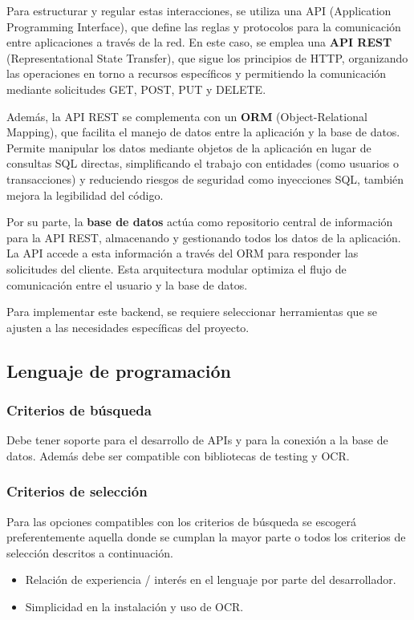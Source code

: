 Para estructurar y regular estas interacciones, se utiliza una API (Application Programming Interface), que define las reglas y protocolos para la comunicación entre aplicaciones a través de la red. En este caso, se emplea una \textbf{API REST} (Representational State Transfer), que sigue los principios de HTTP, organizando las operaciones en torno a recursos específicos y permitiendo la comunicación mediante solicitudes GET, POST, PUT y DELETE. 

Además, la API REST se complementa con un \textbf{ORM} (Object-Relational Mapping), que facilita el manejo de datos entre la aplicación y la base de datos. Permite manipular los datos mediante objetos de la aplicación en lugar de consultas SQL directas, simplificando el trabajo con entidades (como usuarios o transacciones) y reduciendo riesgos de seguridad como inyecciones SQL, también mejora la legibilidad del código.

Por su parte, la \textbf{base de datos} actúa como repositorio central de información para la API REST, almacenando y gestionando todos los datos de la aplicación. La API accede a esta información a través del ORM para responder las solicitudes del cliente. Esta arquitectura modular optimiza el flujo de comunicación entre el usuario y la base de datos\cite{marquez2022backend}.

Para implementar este backend, se requiere seleccionar herramientas que se ajusten a las necesidades específicas del proyecto.

\subsection{Lenguaje de programación}
\subsubsection{Criterios de búsqueda}
Debe tener soporte para el desarrollo de APIs y para la conexión a la base de datos. Además debe ser compatible con bibliotecas de testing y OCR.

\subsubsection{Criterios de selección}
Para las opciones compatibles con los criterios de búsqueda se escogerá preferentemente aquella donde se cumplan la mayor parte o todos los criterios de selección descritos a continuación.

\begin{itemize}
    \item Relación de experiencia / interés en el lenguaje por parte del desarrollador.
    \item Simplicidad en la instalación y uso de OCR.
\end{itemize}

